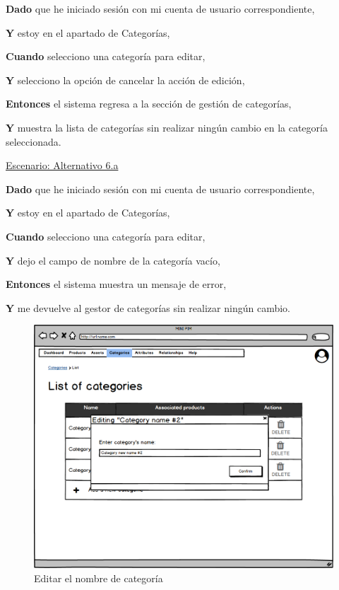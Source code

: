 \textbf{Dado} que he iniciado sesión con mi cuenta de usuario correspondiente,\par
\textbf{Y} estoy en el apartado de Categorías,\par
\textbf{Cuando} selecciono una categoría para editar,\par
\textbf{Y} selecciono la opción de cancelar la acción de edición,\par
\textbf{Entonces} el sistema regresa a la sección de gestión de categorías,\par
\textbf{Y} muestra la lista de categorías sin realizar ningún cambio en la categoría seleccionada.\par

\underline{Escenario: Alternativo 6.a}\par
\vspace{0.15cm}

\textbf{Dado} que he iniciado sesión con mi cuenta de usuario correspondiente,\par
\textbf{Y} estoy en el apartado de Categorías,\par
\textbf{Cuando} selecciono una categoría para editar,\par
\textbf{Y} dejo el campo de nombre de la categoría vacío,\par
\textbf{Entonces} el sistema muestra un mensaje de error,\par
\textbf{Y} me devuelve al gestor de categorías sin realizar ningún cambio.\par

\vspace{0.20cm}

\begin{figure}[H]
    \includegraphics[width=1\linewidth]{mockups/RF4.3_1.png}
    \caption{Editar el nombre de categoría}
   \end{figure}
\vspace{1.0cm}

